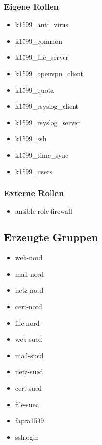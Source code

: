 \subsubsection{Eigene Rollen}
\begin{itemize}
  \item k1599\_anti\_virus
  \item k1599\_common
  \item k1599\_file\_server
  \item k1599\_openvpn\_client
  \item k1599\_quota
  \item k1599\_rsyslog\_client
  \item k1599\_rsyslog\_server
  \item k1599\_ssh
  \item k1599\_time\_sync
  \item k1599\_users
\end{itemize}
\subsubsection{Externe Rollen}
\begin{itemize}
  \item ansible-role-firewall
\end{itemize}
\subsection{Erzeugte Gruppen}
\begin{itemize}
  \item web-nord
  \item mail-nord
  \item netz-nord
  \item cert-nord
  \item file-nord
  \item web-sued
  \item mail-sued
  \item netz-sued
  \item cert-sued
  \item file-sued
  \item fapra1599
  \item sshlogin
\end{itemize}
